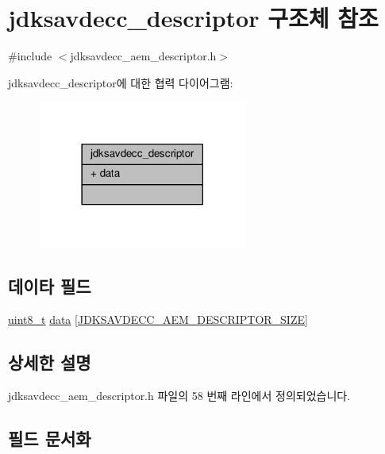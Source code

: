 \hypertarget{structjdksavdecc__descriptor}{}\section{jdksavdecc\+\_\+descriptor 구조체 참조}
\label{structjdksavdecc__descriptor}


{\ttfamily \#include $<$jdksavdecc\+\_\+aem\+\_\+descriptor.\+h$>$}



jdksavdecc\+\_\+descriptor에 대한 협력 다이어그램\+:
\nopagebreak
\begin{figure}[H]
\begin{center}
\leavevmode
\includegraphics[width=194pt]{structjdksavdecc__descriptor__coll__graph}
\end{center}
\end{figure}
\subsection*{데이타 필드}
\begin{DoxyCompactItemize}
\item 
\hyperlink{stdint_8h_aba7bc1797add20fe3efdf37ced1182c5}{uint8\+\_\+t} \hyperlink{structjdksavdecc__descriptor_a6e05367d5486172eb279a52d69b7eea9}{data} \mbox{[}\hyperlink{group__descriptor_ga688689ad1de92c77262259e69b838ebf}{J\+D\+K\+S\+A\+V\+D\+E\+C\+C\+\_\+\+A\+E\+M\+\_\+\+D\+E\+S\+C\+R\+I\+P\+T\+O\+R\+\_\+\+S\+I\+ZE}\mbox{]}
\end{DoxyCompactItemize}


\subsection{상세한 설명}


jdksavdecc\+\_\+aem\+\_\+descriptor.\+h 파일의 58 번째 라인에서 정의되었습니다.



\subsection{필드 문서화}
